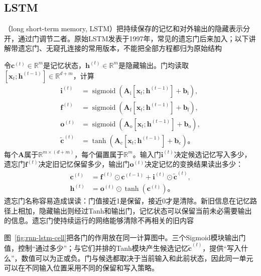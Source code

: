 \subsection{LSTM}
\label{sec:rnn-lstm}

（long short-term memory, LSTM）把持续保存的记忆和对外输出的隐藏表示分开，通过门调节二者。原始LSTM发表于1997年，常见的遗忘门后来加入；以下讲解带遗忘门、无窥孔连接的常用版本，不能把全部方程都归为原始结构

令$\bm{c}^{(t)}\in\mathbb{R}^{m}$是记忆状态，$\bm{h}^{(t)}\in\mathbb{R}^{m}$是隐藏输出。门均读取$[\bm{x}_t;\bm{h}^{(t-1)}]\in\mathbb{R}^{d+m}$，计算
\begin{equation}
  \begin{aligned}
    \bm{i}^{(t)}&=\operatorname{sigmoid}\!\left(
      \bm{A}_{\mathrm{i}}[\bm{x}_t;\bm{h}^{(t-1)}]+\bm{b}_{\mathrm{i}}\right),\\
    \bm{f}^{(t)}&=\operatorname{sigmoid}\!\left(
      \bm{A}_{\mathrm{f}}[\bm{x}_t;\bm{h}^{(t-1)}]+\bm{b}_{\mathrm{f}}\right),\\
    \bm{o}^{(t)}&=\operatorname{sigmoid}\!\left(
      \bm{A}_{\mathrm{o}}[\bm{x}_t;\bm{h}^{(t-1)}]+\bm{b}_{\mathrm{o}}\right),\\
    \widetilde{\bm{c}}^{(t)}&=\tanh\!\left(
      \bm{A}_{\mathrm{c}}[\bm{x}_t;\bm{h}^{(t-1)}]+\bm{b}_{\mathrm{c}}\right)\text{。}
  \end{aligned}
  \label{eq:rnn-lstm-gates}
\end{equation}
每个$\bm{A}$属于$\mathbb{R}^{m\times(d+m)}$，每个偏置属于$\mathbb{R}^{m}$。输入门$\bm{i}^{(t)}$决定候选记忆写入多少，遗忘门$\bm{f}^{(t)}$决定旧记忆保留多少，输出门$\bm{o}^{(t)}$决定记忆的变换结果读出多少：
\begin{equation}
  \begin{aligned}
    \bm{c}^{(t)}&=\bm{f}^{(t)}\odot\bm{c}^{(t-1)}
       +\bm{i}^{(t)}\odot\widetilde{\bm{c}}^{(t)},\\
    \bm{h}^{(t)}&=\bm{o}^{(t)}\odot\tanh\!\left(\bm{c}^{(t)}\right)\text{。}
  \end{aligned}
  \label{eq:rnn-lstm-update}
\end{equation}
遗忘门名称容易造成误读：门值接近1是保留，接近0才是清除。新旧信息在记忆路径上相加，隐藏输出则经过Tanh和输出门，记忆状态可以保留当前未必需要输出的信息。遗忘门使持续运行的网络能够清除不再相关的旧内容

图~\ref{fig:rnn-lstm-cell}把各门的作用放在同一计算图中。三个Sigmoid模块输出门值，控制“通过多少”；与它们并排的Tanh模块产生候选记忆$\widetilde{\bm c}^{(t)}$，提供“写入什么”，数值可以为正或负。门与候选都取决于当前输入和此前状态，因此同一单元可以在不同输入位置采用不同的保留和写入策略。

